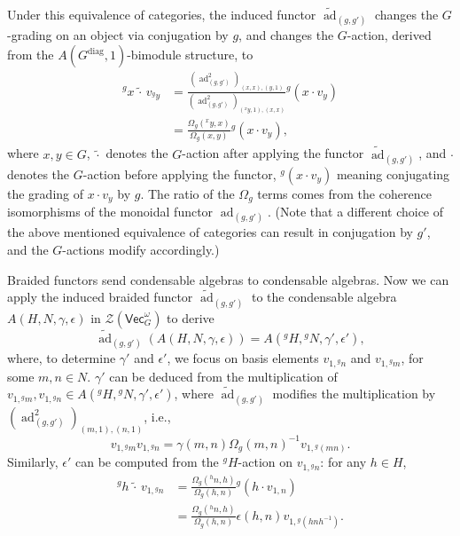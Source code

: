 \documentclass[aps,twocolumn,prx,floatfix,preprintnumbers, nofootinbib,10pt]{revtex4-2}
\numberwithin{equation}{section}
\theoremstyle{definition}
\newcommand{\be}{\begin{equation}}
\newcommand{\ee}{\end{equation}}
\newcommand{\nn}{\nonumber}
\newcommand{\wt}{\widetilde}
\newcommand{\cZ}{\mathcal{Z}}
\renewcommand{\Vec}{\mathsf{Vec}}
\newcommand{\diag}{\text{diag}}
\def\ad{\mathop{\mathrm{ad}}\nolimits}
\begin{document}
Under this equivalence of categories, the induced functor $\wt{\ad}_{(g,g')}$ changes the $G$-grading on an object via conjugation by $g$, and changes the $G$-action, derived from the $A(G^{\diag}, 1)$-bimodule structure, to 
\begin{align}
    {}^gx \,\wt{\cdot}\, v_{{}^gy} & = \frac{(\ad_{(g,g')}^2)_{(x,x),(y,1)}}{(\ad_{(g,g')}^2)_{({}^xy,1),(x,x)}} {}^g(x \cdot v_{y}) \nn\\
    & = \frac{\Omega_g({}^x y, x)}{\Omega_g(x,y)} {}^g(x \cdot v_{y}),
\end{align}
where $x,y\in G$, $\wt{\cdot}$ denotes the $G$-action after applying the functor $\wt{\ad}_{(g,g')}$, and $\cdot$ denotes the $G$-action before applying the functor, ${}^g(x \cdot v_{y})$ meaning conjugating the grading of $x \cdot v_{y}$ by $g$. The ratio of the $\Omega_g$ terms comes from the coherence isomorphisms of the monoidal functor $\ad_{(g,g')}$. (Note that a different choice of the above mentioned equivalence of categories can result in conjugation by $g'$, and the $G$-actions modify accordingly.)

Braided functors send condensable algebras to condensable algebras. Now we can apply the induced braided functor $\wt{\ad}_{(g,g')}$ to the condensable algebra $A(H,N,\gamma,\epsilon)$ in $\cZ(\Vec_G^\omega)$ to derive 
\be
    \wt{\ad}_{(g,g')}(A(H,N,\gamma,\epsilon)) = A({}^gH, {}^g N, \gamma',\epsilon'),
\ee
where, to determine $\gamma'$ and $\epsilon'$, we focus on basis elements $v_{1,{}^gn}$ and $v_{1,{}^gm}$, for some $m,n\in N$. $\gamma'$ can be deduced from the multiplication of $v_{1,{}^g m}, v_{1,{}^g n}\in A({}^gH, {}^g N, \gamma',\epsilon')$, where $\wt{\ad}_{(g,g')}$ modifies the multiplication by $(\ad_{(g,g')}^2)_{(m,1),(n,1)}$, i.e., 
\be
    v_{1,{}^g m} v_{1,{}^g n} = \gamma(m,n)\Omega_g(m,n)^{-1} v_{1,{}^g(mn)}.
\ee
Similarly, $\epsilon'$ can be computed from the ${}^g\!H$-action on $v_{1,{}^gn}$: for any $h\in H$, 
\begin{align}
    {}^gh \,\wt{\cdot}\, v_{1,{}^gn} & = \frac{\Omega_g({}^h n, h)}{\Omega_g(h,n)}{}^g(h\cdot v_{1,n}) \nn\\
    & = \frac{\Omega_g({}^h n, h)}{\Omega_g(h,n)} \epsilon(h,n) v_{1,{}^g(hnh^{-1})}.
\end{align}
\end{document}
